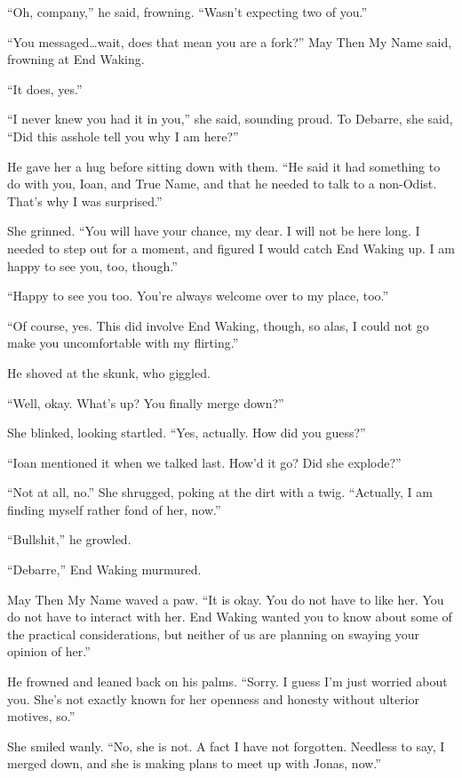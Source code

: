 ``Oh, company,'' he said, frowning. ``Wasn't expecting two of you.''

``You messaged\ldots wait, does that mean you are a fork?'' May Then My Name said, frowning at End Waking.

``It does, yes.''

``I never knew you had it in you,'' she said, sounding proud. To Debarre, she said, ``Did this asshole tell you why I am here?''

He gave her a hug before sitting down with them. ``He said it had something to do with you, Ioan, and True Name, and that he needed to talk to a non-Odist. That's why I was surprised.''

She grinned. ``You will have your chance, my dear. I will not be here long. I needed to step out for a moment, and figured I would catch End Waking up. I am happy to see you, too, though.''

``Happy to see you too. You're always welcome over to my place, too.''

``Of course, yes. This did involve End Waking, though, so alas, I could not go make you uncomfortable with my flirting.''

He shoved at the skunk, who giggled.

``Well, okay. What's up? You finally merge down?''

She blinked, looking startled. ``Yes, actually. How did you guess?''

``Ioan mentioned it when we talked last. How'd it go? Did she explode?''

``Not at all, no.'' She shrugged, poking at the dirt with a twig. ``Actually, I am finding myself rather fond of her, now.''

``Bullshit,'' he growled.

``Debarre,'' End Waking murmured.

May Then My Name waved a paw. ``It is okay. You do not have to like her. You do not have to interact with her. End Waking wanted you to know about some of the practical considerations, but neither of us are planning on swaying your opinion of her.''

He frowned and leaned back on his palms. ``Sorry. I guess I'm just worried about you. She's not exactly known for her openness and honesty without ulterior motives, so.''

She smiled wanly. ``No, she is not. A fact I have not forgotten. Needless to say, I merged down, and she is making plans to meet up with Jonas, now.''

